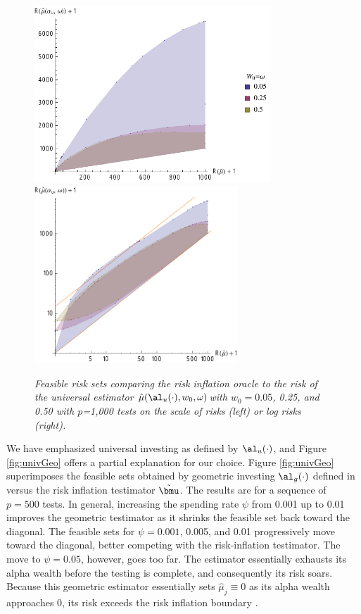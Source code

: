 \documentclass[12pt]{article}
\newcommand{\uTest}{\mbox{$\hat\mu(\al_u(\cdot),w_0,\omega)$}}
\begin{document}
\begin{figure}
 \caption{ \label{fig:univRI} {\sl Feasible risk sets comparing the risk
 inflation oracle to the risk of the universal estimator \uTest with $w_0=0.05$,
 0.25, and 0.50 with $p$=1,000 tests on the scale of risks (left) or log risks
 (right).}  }

 \vspace{0.1in}
 \centerline{
 \includegraphics[width=3.5in]{figures/univVsRI}
 \includegraphics[width=3.0in]{figures/univVsRILog}    }
 \vspace{0.2in}
\end{figure}


 We have emphasized universal investing as defined by $\al_u(\cdot)$, and Figure
 \ref{fig:univGeo} offers a partial explanation for our choice.  Figure
 \ref{fig:univGeo} superimposes the feasible sets obtained by geometric investing
 $\al_g(\cdot)$ defined in  versus the risk inflation testimator
 $\tilde{\bmu}$.  The results are for a sequence of $p = 500$ tests.  In
 general, increasing the spending rate $\psi$ from 0.001 up to 0.01 improves the
 geometric testimator as it shrinks the feasible set back toward the diagonal.
  The feasible sets for $\psi=0.001$, 0.005, and 0.01 progressively move toward
 the diagonal, better competing with the risk-inflation testimator.  The move to
 $\psi = 0.05$, however, goes too far.  The estimator essentially exhausts its
 alpha wealth before the testing is complete, and consequently its risk soars.
  Because this geometric estimator essentially sets $\hat\mu_j \equiv 0$ as its
 alpha wealth approaches 0, its risk exceeds the risk inflation boundary
 .
\end{document}
